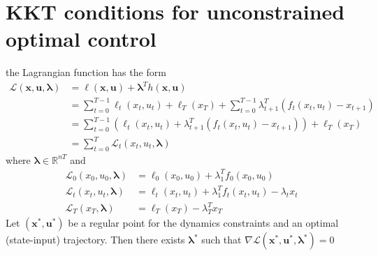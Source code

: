 \documentclass[openany]{book}
\newcommand{\R}{\mathbb{R}} %
\theoremstyle{definition}
\theoremstyle{remark}
\begin{document}
\section{KKT conditions for unconstrained optimal control}
the Lagrangian function has the form 
\begin{align*}
    \mathcal{L}(\mathbf{x,u,\lambda}) &= \ell(\mathbf{x,u})+\boldsymbol{\lambda}^Th(\mathbf{x,u}) \\
    &= \displaystyle\sum_{t=0}^{T-1}\ell_t(x_t,u_t)+\ell_T(x_T) + \displaystyle\sum_{t=0}^{T-1}\lambda^T_{t+1}(f_t(x_t,u_t)-x_{t+1}) \\
    &= \displaystyle\sum_{t=0}^{T-1}\left(\ell_t(x_t,u_t)+\lambda^T_{t+1}(f_t(x_t,u_t)-x_{t+1})\right)+\ell_T(x_T) \\
    &=\displaystyle\sum_{t=0}^{T}\mathcal{L}_t(x_t,u_t,\boldsymbol{\lambda})
\end{align*}
where $\boldsymbol{\lambda}\in\R^{nT}$ and 
\begin{align*}
    \mathcal{L}_0(x_0,u_0,\boldsymbol{\lambda}) &= \ell_0(x_0,u_0)+\lambda_1^T f_0(x_0,u_0)\\
    \mathcal{L}_t(x_t,u_t,\boldsymbol{\lambda}) &= \ell_t(x_t,u_t)+\lambda_1^T f_t(x_t,u_t)-\lambda_tx_t\\
    \mathcal{L}_T(x_T,\boldsymbol{\lambda}) &= \ell_T(x_T) - \lambda_T^Tx_T
\end{align*}
Let $(\mathbf{x}^*,\mathbf{u}^*)$ be a regular point for the dynamics constraints and an optimal (state-input) trajectory. Then there exists $\boldsymbol{\lambda}^*$ such that $\nabla \mathcal{L}(\mathbf{x}^*,\mathbf{u}^*,\boldsymbol{\lambda}^*)=0$ 
\end{document}
